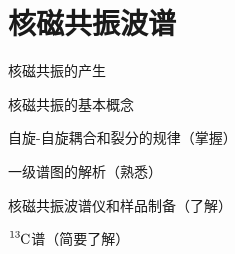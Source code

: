 \chapter{核磁共振波谱}

\begin{introduction}
	\item 核磁共振的产生
	\item 核磁共振的基本概念
	\item 自旋-自旋耦合和裂分的规律（掌握）
	\item 一级谱图的解析（熟悉）
	\item 核磁共振波谱仪和样品制备（了解）
	\item $\ce{^{13}C}$谱（简要了解）
\end{introduction}

